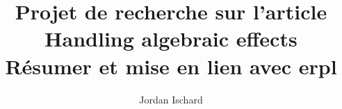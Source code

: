 \usepackage[utf8]{inputenc}
\usepackage{version}

\usepackage{amssymb,amsmath,amsthm}
\usepackage{graphicx}
\usepackage{enumerate}
\usepackage{tikz}
\usetikzlibrary{matrix,arrows}
\usepackage{todonotes}
\usepackage{fullpage}
\usepackage{hyperref}
\usepackage[french,linesnumbered,lined,boxed,commentsnumbered,ruled,vlined]{algorithm2e}

\renewcommand{\contentsname}{Table des matières}   


%
%

\usepackage{tikz}
\usetikzlibrary{positioning}
\usetikzlibrary{calc}

\usepackage[affil-it]{authblk}

\renewcommand*{\Authsep}{, }
\renewcommand*{\Authand}{, }
\renewcommand*{\Authands}{, }

\title{Projet de recherche sur l'article \textbf{Handling algebraic effects}\\
Résumer et mise en lien avec \textbf{erpl}}

\author[1]{Jordan Ischard}


\date{}

\newtheorem{theorem}{Théorème}
\newtheorem{lemma}{Lemme}
\newtheorem{corollary}[theorem]{Corollaire}
\newtheorem{claim}[theorem]{Claim}
\newtheorem{proposition}[theorem]{Proposition}
\newtheorem{definition}{Définition}
\theoremstyle{definition}
\newtheorem*{remark}{Remarque}
\newtheorem{exemple}{Exemple}

\newenvironment{proofclaim}{
	\noindent \emph{Proof.}
}{%
	\hfill $\diamond$ \\
}

\newcommand{\probleme}[4]{

    \vspace{0.4cm}
    \fbox{
        \begin{minipage}{0.95 \linewidth}
            \centerline{\textsc{\underline{#1}}}
            \textbf{Entr\'ee} : #2 \\ \textbf{#4} : #3
        \end{minipage}
    }
    \vspace{0.4cm}

}

\newcommand{\RMV}{\todo[inline]{Paragraphe à supprimer}}
\renewcommand*{\proofname}{Preuve}
